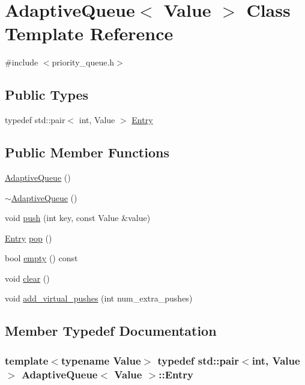 \hypertarget{classAdaptiveQueue}{\section{Adaptive\-Queue$<$ Value $>$ Class Template Reference}
\label{classAdaptiveQueue}
}


{\ttfamily \#include $<$priority\-\_\-queue.\-h$>$}

\subsection*{Public Types}
\begin{DoxyCompactItemize}
\item 
typedef std\-::pair$<$ int, Value $>$ \hyperlink{classAdaptiveQueue_a72a962211b8c52208580935d01bcaaa4}{Entry}
\end{DoxyCompactItemize}
\subsection*{Public Member Functions}
\begin{DoxyCompactItemize}
\item 
\hyperlink{classAdaptiveQueue_a447601821d0fe5dafa3cca82c015ddc7}{Adaptive\-Queue} ()
\item 
\hyperlink{classAdaptiveQueue_a94bc77945a01b338061c014d6be3cd7c}{$\sim$\-Adaptive\-Queue} ()
\item 
void \hyperlink{classAdaptiveQueue_a6308ad70f0102672324c20d502036aa5}{push} (int key, const Value \&value)
\item 
\hyperlink{classAdaptiveQueue_a72a962211b8c52208580935d01bcaaa4}{Entry} \hyperlink{classAdaptiveQueue_ae188c14bef82f7b833f21940c6c0fa8a}{pop} ()
\item 
bool \hyperlink{classAdaptiveQueue_a4111d42beeb98471e5e1fd240f8dc0d3}{empty} () const 
\item 
void \hyperlink{classAdaptiveQueue_adea90ba174e69361f492636e49d49343}{clear} ()
\item 
void \hyperlink{classAdaptiveQueue_a08008edc6ba3953ea741dbcb5cda01f0}{add\-\_\-virtual\-\_\-pushes} (int num\-\_\-extra\-\_\-pushes)
\end{DoxyCompactItemize}


\subsection{Member Typedef Documentation}
\hypertarget{classAdaptiveQueue_a72a962211b8c52208580935d01bcaaa4}{
\subsubsection[{Entry}]{\setlength{\rightskip}{0pt plus 5cm}template$<$typename Value$>$ typedef std\-::pair$<$int, Value$>$ {\bf Adaptive\-Queue}$<$ Value $>$\-::{\bf Entry}}}\label{classAdaptiveQueue_a72a962211b8c52208580935d01bcaaa4}


